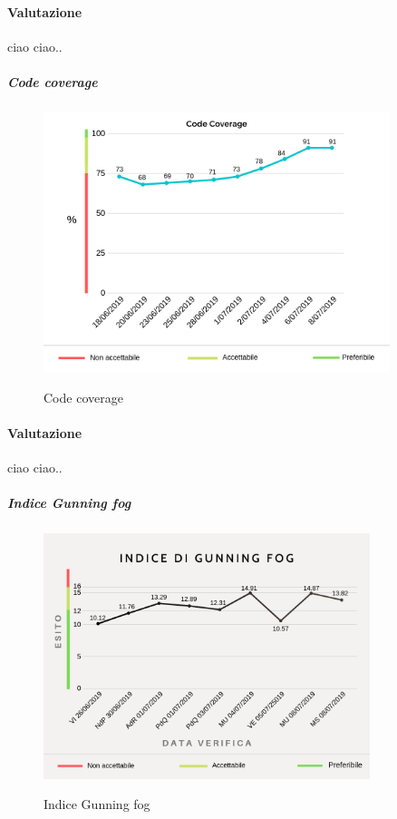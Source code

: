 	\paragraph*{Valutazione} ciao ciao..
	\pagebreak
	\subparagraph{Code coverage}
	\begin{center}
		\begin{figure}[h] 
			\centering 
			\includegraphics[width=0.90\textwidth]{res/images/new/codecov.png}\\
			\caption{Code coverage}
		\end{figure}
	\end{center}
	\paragraph*{Valutazione} ciao ciao..
	\pagebreak
	\subparagraph{Indice Gunning fog}
	\begin{center}
		\begin{figure}[h] 
			\centering 
			\includegraphics[width=0.85\textwidth]{res/images/new/gunningfog.png}\\
			\caption{Indice Gunning fog}
		\end{figure}
	\end{center}
